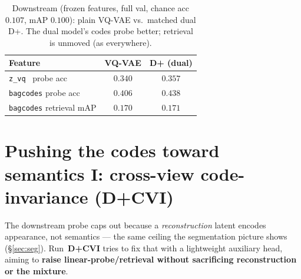 \documentclass[11pt]{article}
\newcommand{\good}[1]{\textcolor{green!55!black}{#1}}
\begin{document}
\begin{table}[h]
\centering
\caption{Downstream (frozen features, full val, chance acc $0.107$, mAP $0.100$): plain VQ-VAE vs.\
matched dual D+. The dual model's codes probe better; retrieval is unmoved (as everywhere).}
\label{tab:vqdownstream}
\small
\begin{tabular}{lcc}
\toprule
Feature & \textbf{VQ-VAE} & \textbf{D+} (dual)\\
\midrule
\texttt{z\_vq} \ probe acc      & $0.340$ & \good{$0.357$}\\
\texttt{bagcodes} probe acc     & $0.406$ & \good{$0.438$}\\
\texttt{bagcodes} retrieval mAP & $0.170$ & $0.171$\\
\bottomrule
\end{tabular}
\end{table}

\section{Pushing the codes toward semantics I: cross-view code-invariance (D+CVI)}
\label{sec:cvi}
The downstream probe caps out because a \emph{reconstruction} latent encodes
appearance, not semantics --- the same ceiling the segmentation picture shows
(\S\ref{sec:seg}). Run~\textbf{D+CVI} tries to fix that with a lightweight auxiliary head,
aiming to \textbf{raise linear-probe/retrieval without sacrificing reconstruction or the mixture}.
\end{document}

